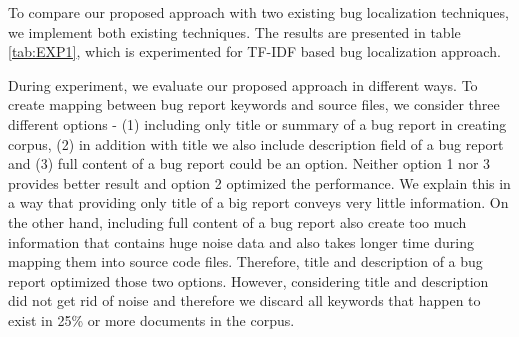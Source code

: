 \documentclass{sig-alternate}
\begin{document}
To compare our proposed approach with two existing bug localization techniques, we implement both existing techniques. The results are presented in table \ref{tab:EXP1}, which is experimented for TF-IDF based bug localization approach.
\begin{table}[!t]
\caption{The Performance for Top 1, Top 5 and Top 10 in our proposed approach}
\label{tab:EXP3}
\centering
{}
\end{table}

During experiment, we evaluate our proposed approach in different ways. To create mapping between bug report keywords and source files, we consider three different options - (1) including only title or summary of a bug report in creating corpus, (2) in addition with title we also include description field of a bug report and (3) full content of a bug report could be an option. Neither option 1 nor 3 provides better result and option 2 optimized the performance. We explain this in a way that providing only title of a big report conveys very little information. On the other hand, including full content of a bug report also create too much information that contains huge noise data and also takes longer time during mapping them into source code files. Therefore, title and description of a bug report optimized those two options. However, considering title and description did not get rid of noise and therefore we discard all keywords that happen to exist in 25\% or more documents in the corpus.
\end{document}
